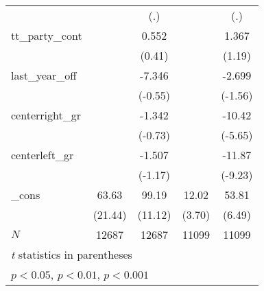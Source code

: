 {\begin{tabular}{l*{4}{c}}
            &                     &         (.)         &                     &         (.)         \\
[1em]
tt\_party\_cont&                     &       0.552         &                     &       1.367         \\
            &                     &      (0.41)         &                     &      (1.19)         \\
[1em]
last\_year\_off&                     &      -7.346         &                     &      -2.699         \\
            &                     &     (-0.55)         &                     &     (-1.56)         \\
[1em]
centerright\_gr&                     &      -1.342         &                     &      -10.42\sym{***}\\
            &                     &     (-0.73)         &                     &     (-5.65)         \\
[1em]
centerleft\_gr&                     &      -1.507         &                     &      -11.87\sym{***}\\
            &                     &     (-1.17)         &                     &     (-9.23)         \\
[1em]
\_cons      &       63.63\sym{***}&       99.19\sym{***}&       12.02\sym{***}&       53.81\sym{***}\\
            &     (21.44)         &     (11.12)         &      (3.70)         &      (6.49)         \\
\hline
\(N\)       &       12687         &       12687         &       11099         &       11099         \\
\hline\hline
\multicolumn{5}{l}{\footnotesize \textit{t} statistics in parentheses}\\
\multicolumn{5}{l}{\footnotesize \sym{*} \(p<0.05\), \sym{**} \(p<0.01\), \sym{***} \(p<0.001\)}\\
\end{tabular}
}
